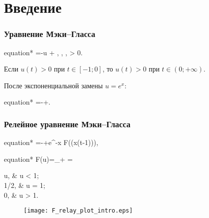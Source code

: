 \begin{frame}
    \setcounter{framenumber}{1}
    \maketitle
\end{frame}

\section{Введение}

\begin{frame}
	\frametitle{Уравнение Мэки--Гласса}
	
	\begin{empheq}[box=\myeq]{equation*}
		=-\beta u + , 
		\quad \alpha, \beta, \gamma > 0.
	\end{empheq}
	
	Если $u(t) > 0$ при $t \in [-1; 0]$, то $u(t) > 0$ при $t \in (0; + \infty)$.
	
	\pause
	\bigskip
	
	После экспоненциальной замены $u = e^x$:
	
	\begin{empheq}[box=\myeq]{equation*}
		=-\beta+\alpha{}.
	\end{empheq}
\end{frame}

\begin{frame}
	\frametitle{Релейное уравнение Мэки--Гласса}
	
	\begin{empheq}[box=\myeq]{equation*}
		=-\beta+\alpha e^{-x} F\left(\exp(x(t-1))\right),
	\end{empheq}
	
	\begin{empheq}[box=\myeq]{equation*}
		 F(u)=\lim\limits_{\gamma\to +\infty} = 
		\begin{cases}
			u, & u < 1;\\
			1/2, & u = 1;\\
			0, & u > 1.
		\end{cases}
	\end{empheq}
	
	\begin{figure}[ht]
		\centering
		\texttt{[image: F\_relay\_plot\_intro.eps]}
	\end{figure}
\end{frame}

